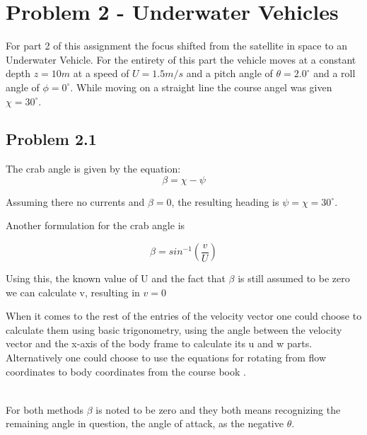\section*{Problem 2 - Underwater Vehicles}
For part 2 of this assignment the focus shifted from the satellite in space to an Underwater Vehicle. For the entirety of this part the vehicle moves at a constant depth $z=10m$ at a speed of $U=1.5m/s$ and a pitch angle of $\theta = 2.0^\circ$ and a roll angle of $\phi = 0^\circ$. While moving on a straight line the course angel was given $\chi = 30^\circ$.
\subsection*{Problem 2.1}
The crab angle is given by the equation:
\begin{equation}
    \beta = \chi - \psi
\end{equation}

Assuming there no currents and $\beta = 0$, the resulting heading is $\psi = \chi = 30^\circ$.

Another formulation for the crab angle is

\begin{equation}
    \beta = sin^{-1}(\frac{v}{U})
\end{equation}

Using this, the known value of U and the fact that $\beta$ is still assumed to be zero we can calculate v, resulting in $v=0$

When it comes to the rest of the entries of the velocity vector one could choose to calculate them using basic trigonometry, using the angle between the velocity vector and the x-axis of the body frame to calculate its u and w parts. Alternatively one could choose to use the equations for rotating from flow coordinates to body coordinates from the course book \cite{Fossen2011}. 

\begin{equation}
    \begin{align}
        
    \end{align}
\end{equation}

For both methods $\beta$ is noted to be zero and they both means recognizing the remaining angle in question, the angle of attack, as the negative $\theta$. 

